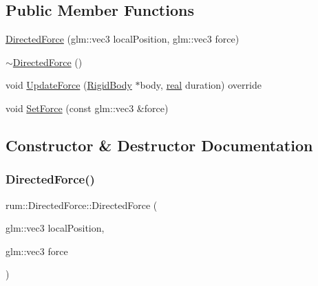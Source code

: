 \subsection*{Public Member Functions}
\begin{DoxyCompactItemize}
\item 
\hyperlink{classrum_1_1_directed_force_ac6be6fbfe8f21ed2c6c3cf050ac180b8}{Directed\+Force} (glm\+::vec3 local\+Position, glm\+::vec3 force)
\item 
\hyperlink{classrum_1_1_directed_force_a6da6baf550b205f22f3c95d7140334c0}{$\sim$\+Directed\+Force} ()
\item 
void \hyperlink{classrum_1_1_directed_force_a79b53d849f80fb69ca1fa42ea43829b4}{Update\+Force} (\hyperlink{classrum_1_1_rigid_body}{Rigid\+Body} $\ast$body, \hyperlink{namespacerum_a7e8cca23573d5eaead0f138cbaa4862c}{real} duration) override
\item 
void \hyperlink{classrum_1_1_directed_force_ae632c56c26193e81ff71501dab5b8e04}{Set\+Force} (const glm\+::vec3 \&force)
\end{DoxyCompactItemize}


\subsection{Constructor \& Destructor Documentation}
\mbox{\label{classrum_1_1_directed_force_ac6be6fbfe8f21ed2c6c3cf050ac180b8}} 
\subsubsection{\texorpdfstring{Directed\+Force()}{DirectedForce()}}
{\footnotesize\ttfamily rum\+::\+Directed\+Force\+::\+Directed\+Force (\begin{DoxyParamCaption}\item[{glm\+::vec3}]{local\+Position,  }\item[{glm\+::vec3}]{force }\end{DoxyParamCaption})}

\mbox{\label{classrum_1_1_directed_force_a6da6baf550b205f22f3c95d7140334c0}} 
